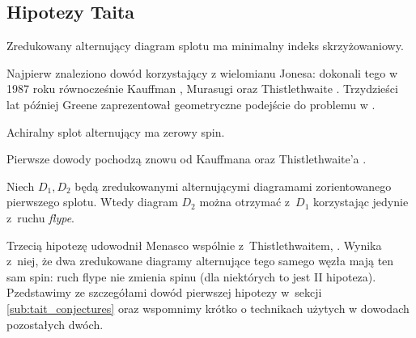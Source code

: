 \subsection{Hipotezy Taita}
\begin{conjecture}
    \label{con:tait_1}
    Zredukowany alternujący diagram splotu ma minimalny indeks skrzyżowaniowy.
\end{conjecture}

Najpierw znaleziono dowód korzystający z wielomianu Jonesa: dokonali tego w 1987 roku równocześnie Kauffman \cite{kauffman87}, Murasugi \cite{murasugi87} oraz Thistlethwaite \cite{thistlethwaite87}.
Trzydzieści lat później Greene zaprezentował geometryczne podejście do problemu w \cite{greene17}.

\begin{conjecture}

    Achiralny splot alternujący ma zerowy spin.
\end{conjecture}

Pierwsze dowody pochodzą znowu od Kauffmana \cite{kauffman87} oraz Thistlethwaite'a \cite{thistlethwaite87}.

\begin{conjecture}
    Niech $D_1, D_2$ będą zredukowanymi alternującymi diagramami zorientowanego pierwszego splotu.
    Wtedy diagram $D_2$ można otrzymać z~$D_1$ korzystając jedynie z~ruchu \emph{flype}.
%
\end{conjecture}

Trzecią hipotezę udowodnił Menasco wspólnie z~Thistlethwaitem, \cite{menasco91}.
Wynika z~niej, że dwa zredukowane diagramy alternujące tego samego węzła mają ten sam spin: ruch flype nie zmienia spinu (dla niektórych to jest II hipoteza).
Pzedstawimy ze szczegółami dowód pierwszej hipotezy w~sekcji \ref{sub:tait_conjectures} oraz wspomnimy krótko o technikach użytych w dowodach pozostałych dwóch.
